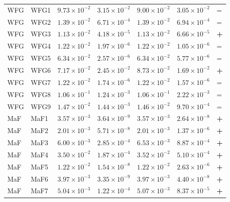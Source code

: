 \begin{table}[t]
\begin{tabular}{llrrrrl}
\addlinespace
WFG & WFG1 & $9.73\!\times\!10^{-2}$ & $3.15\!\times\!10^{-2}$ & $9.00\!\times\!10^{-2}$ & $3.05\!\times\!10^{-2}$ & = \\
WFG & WFG2 & $1.39\!\times\!10^{-2}$ & $6.71\!\times\!10^{-4}$ & $1.39\!\times\!10^{-2}$ & $6.94\!\times\!10^{-4}$ & = \\
WFG & WFG3 & $1.13\!\times\!10^{-2}$ & $4.18\!\times\!10^{-5}$ & $1.13\!\times\!10^{-2}$ & $6.66\!\times\!10^{-5}$ & \textbf{+} \\
WFG & WFG4 & $1.22\!\times\!10^{-2}$ & $1.97\!\times\!10^{-6}$ & $1.22\!\times\!10^{-2}$ & $1.05\!\times\!10^{-6}$ & = \\
WFG & WFG5 & $6.34\!\times\!10^{-2}$ & $2.57\!\times\!10^{-6}$ & $6.34\!\times\!10^{-2}$ & $5.77\!\times\!10^{-6}$ & = \\
WFG & WFG6 & $7.17\!\times\!10^{-2}$ & $2.45\!\times\!10^{-2}$ & $8.73\!\times\!10^{-2}$ & $1.69\!\times\!10^{-2}$ & \textbf{+} \\
WFG & WFG7 & $1.22\!\times\!10^{-2}$ & $1.74\!\times\!10^{-6}$ & $1.22\!\times\!10^{-2}$ & $1.57\!\times\!10^{-6}$ & = \\
WFG & WFG8 & $1.06\!\times\!10^{-1}$ & $1.24\!\times\!10^{-3}$ & $1.06\!\times\!10^{-1}$ & $2.22\!\times\!10^{-3}$ & = \\
WFG & WFG9 & $1.47\!\times\!10^{-2}$ & $1.44\!\times\!10^{-3}$ & $1.46\!\times\!10^{-2}$ & $9.70\!\times\!10^{-4}$ & = \\
\addlinespace
MaF & MaF1 & $3.57\!\times\!10^{-3}$ & $3.64\!\times\!10^{-9}$ & $3.57\!\times\!10^{-3}$ & $2.64\!\times\!10^{-8}$ & \textbf{+} \\
MaF & MaF2 & $2.01\!\times\!10^{-3}$ & $5.71\!\times\!10^{-8}$ & $2.01\!\times\!10^{-3}$ & $1.37\!\times\!10^{-6}$ & \textbf{+} \\
MaF & MaF3 & $6.00\!\times\!10^{-3}$ & $2.85\!\times\!10^{-4}$ & $6.53\!\times\!10^{-3}$ & $8.87\!\times\!10^{-4}$ & \textbf{+} \\
MaF & MaF4 & $3.50\!\times\!10^{-2}$ & $1.87\!\times\!10^{-4}$ & $3.52\!\times\!10^{-2}$ & $5.10\!\times\!10^{-4}$ & \textbf{+} \\
MaF & MaF5 & $1.22\!\times\!10^{-2}$ & $1.54\!\times\!10^{-8}$ & $1.22\!\times\!10^{-2}$ & $2.63\!\times\!10^{-6}$ & \textbf{+} \\
MaF & MaF6 & $3.97\!\times\!10^{-3}$ & $3.35\!\times\!10^{-9}$ & $3.97\!\times\!10^{-3}$ & $4.40\!\times\!10^{-8}$ & \textbf{+} \\
MaF & MaF7 & $5.04\!\times\!10^{-3}$ & $1.22\!\times\!10^{-4}$ & $5.07\!\times\!10^{-3}$ & $8.37\!\times\!10^{-5}$ & \textbf{+} \\
\bottomrule
\end{tabular}
\end{table}
